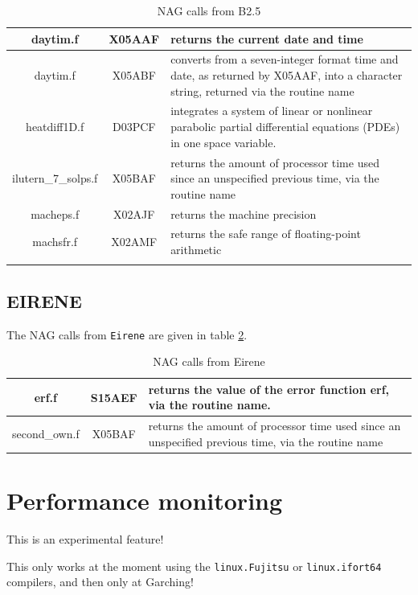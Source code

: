 \documentclass[a4paper,10pt]{report}
\begin{document}
\begin{center}
\begin{longtable}[hbtp]{|c|c|p{10cm}|}
daytim.f                &  X05AAF & returns the current date and time \\ \hline
daytim.f                &  X05ABF & converts from a seven-integer format time and date, as returned by X05AAF, into a character string, returned via the routine name \\ \hline
heatdiff1D.f            &  D03PCF & integrates a system of linear or nonlinear parabolic partial differential equations (PDEs) in one space variable. \\ \hline
ilutern\_7\_solps.f     &  X05BAF & returns the amount of processor time used since an unspecified previous time, via the routine name \\ \hline
macheps.f               &  X02AJF & returns the machine precision \\ \hline
machsfr.f               &  X02AMF & returns the safe range of floating-point arithmetic \\
  \hline
  \caption{NAG calls from B2.5}
  \label{tab:nagb2}
  \end{longtable}
\end{center}

\subsection{EIRENE}

The NAG calls from {\tt Eirene} are given in table \ref{tab:nageirene}.

\begin{table}[hbtp]
  \centering
  \begin{tabular}{|c|c|p{10cm}|} \hline
erf.f            & S15AEF & returns the value of the error function erf, via the routine name. \\ \hline
second\_own.f    & X05BAF & returns the amount of processor time used since an unspecified previous time, via the routine name \\ \hline
  \end{tabular}
  \caption{NAG calls from Eirene}
  \label{tab:nageirene}
\end{table}

\section{Performance monitoring}

This is an experimental feature!

This only works at the moment using the {\tt linux.Fujitsu} or {\tt linux.ifort64}
compilers, and then only at Garching!
\end{document}
